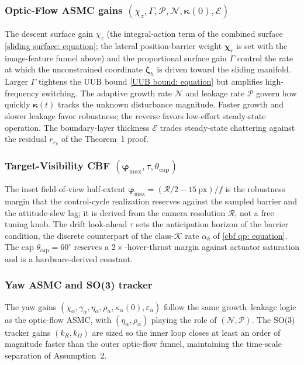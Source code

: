 {\subsubsection{Optic-Flow ASMC gains $(\chi_z, \Gamma, \mathcal{P}, \mathcal{N}, \boldsymbol{\kappa}(0), \mathcal{E})$} The descent surface gain $\chi_z$ (the integral-action term of the combined surface \eqref{sliding surface: equation}; the lateral position-barrier weight $\boldsymbol{\chi}_r$ is set with the image-feature funnel above) and the proportional surface gain $\Gamma$ control the rate at which the unconstrained coordinate $\boldsymbol{\zeta}_h$ is driven toward the sliding manifold. Larger $\Gamma$ tightens the UUB bound \eqref{UUB bound: equation} but amplifies high-frequency switching. The adaptive growth rate $\mathcal{N}$ and leakage rate $\mathcal{P}$ govern how quickly $\boldsymbol{\kappa}(t)$ tracks the unknown disturbance magnitude. Faster growth and slower leakage favor robustness; the reverse favors low-effort steady-state operation. The boundary-layer thickness $\mathcal{E}$ trades steady-state chattering against the residual $r_{\varepsilon_k}$ of the Theorem~1 proof.

\subsubsection{Target-Visibility CBF $(\boldsymbol{\varphi}_\text{max}, \tau, \theta_\text{cap})$} The inset field-of-view half-extent $\boldsymbol{\varphi}_\text{max}=(\mathcal{R}/2-15~\text{px})/f$ is the robustness margin that the control-cycle realization reserves against the sampled barrier and the attitude-slew lag; it is derived from the camera resolution $\mathcal{R}$, not a free tuning knob. The drift look-ahead $\tau$ sets the anticipation horizon of the barrier condition, the discrete counterpart of the class-$\mathcal{K}$ rate $\alpha_k$ of \eqref{cbf qp: equation}. The cap $\theta_\text{cap}=60^\circ$ reserves a $2\times$-hover-thrust margin against actuator saturation and is a hardware-derived constant.

\subsubsection{Yaw ASMC and SO(3) tracker} The yaw gains $(\chi_\alpha, \gamma_\alpha, \eta_\alpha, \rho_\alpha, \kappa_\alpha(0), \varepsilon_\alpha)$ follow the same growth--leakage logic as the optic-flow ASMC, with $(\eta_\alpha, \rho_\alpha)$ playing the role of $(\mathcal{N}, \mathcal{P})$. The SO(3) tracker gains $(k_R, k_\Omega)$ are sized so the inner loop closes at least an order of magnitude faster than the outer optic-flow funnel, maintaining the time-scale separation of Assumption~2.}

